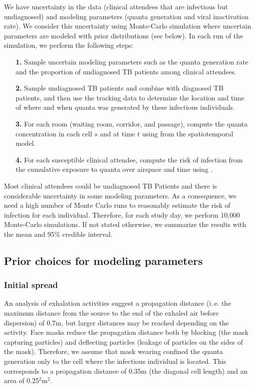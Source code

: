 \documentclass[fleqn,11pt]{wlscirep_supp}
\newcommand\ie{i.\,e.\xspace}
\begin{document}
We have uncertainty in the data (clinical attendees that are infectious but undiagnosed) and modeling parameters (quanta generation and viral inactivation rate). We consider this uncertainty using Monte-Carlo simulation where uncertain parameters are modeled with prior distributions (see  below). In each run of the simulation, we perform the following steps:
\begin{itemize}
    \item[\textbf{1.}] Sample uncertain modeling parameters such as the quanta generation rate and the proportion of undiagnosed TB patients among clinical attendees.
    \item[\textbf{2.}] Sample undiagnosed TB patients and combine with diagnosed TB patients, and then use the tracking data to determine the location and time of where and when quanta was generated by these infectious individuals.
    \item[\textbf{3.}] For each room (waiting room, corridor, and passage), compute the quanta concentration in each cell $s$ and at time $t$ using  from the spatiotemporal model.
    \item[\textbf{4.}] For each susceptible clinical attendee, compute the risk of infection from the cumulative exposure to quanta over airspace and time using .
\end{itemize}

Most clinical attendees could be undiagnosed TB Patients and there is considerable uncertainty in some modeling parameters. As a consequence, we need a high number of Monte Carlo runs to reasonably estimate the risk of infection for each individual. Therefore, for each study day, we perform 10,000 Monte-Carlo simulations. If not stated otherwise, we summarize the results with the mean and 95\% credible interval. 

\subsection{Prior choices for modeling parameters}\label{sec:priors}

\subsubsection{Initial spread}


An analysis of exhalation activities suggest a propagation distance (\ie the maximum distance from the source to the end of the exhaled air before dispersion) of 0.7m\cite{Tang2013PLoSOne}, but larger distances may be reached depending on the activity. Face masks reduce the propagation distance both by blocking (the mask capturing particles) and deflecting particles (leakage of particles on the sides of the mask)\cite{Tang2009RoyalInt,Hui2012PLoSOne,Mansour2013AerosolMed}. Therefore, we assume that mask wearing confined the quanta generation only to the cell where the infectious individual is located. This corresponds to a propagation distance of 0.35m (the diagonal cell length) and an area of 0.25$^2$m$^2$. 
\end{document}
